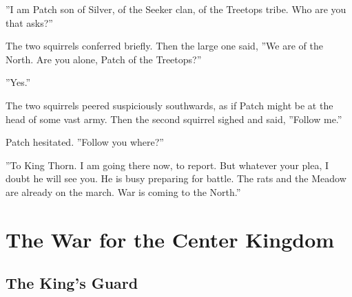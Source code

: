 \documentclass[12pt]{book}
\begin{document}
 ''I am Patch son of Silver, of the Seeker clan, of the Treetops tribe. Who are you that asks?''\par
 The two squirrels conferred briefly. Then the large one said, ''We are of the North. Are you alone, Patch of the Treetops?''\par
 ''Yes.''\par
 The two squirrels peered suspiciously southwards, as if Patch might be at the head of some vast army. Then the second squirrel sighed and said, ''Follow me.''\par
 Patch hesitated. ''Follow you where?''\par
 ''To King Thorn. I am going there now, to report. But whatever your plea, I doubt he will see you. He is busy preparing for battle. The rats and the Meadow are already on the march. War is coming to the North.''\par

\chapter{The War for the Center Kingdom}

\section{The King's Guard}
\end{document}
